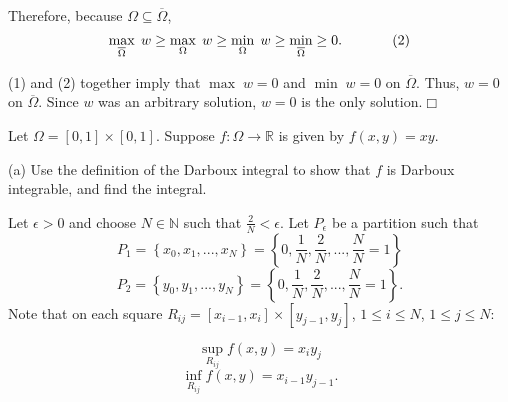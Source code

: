 \documentclass[11pt]{article}
\begin{document}
\begin{itemize}
\noindent Therefore, because $\Omega\subseteq \overline{\Omega}$,
\[
\max\limits_{\overline{\Omega}}\;w\geq \max\limits_\Omega\;w\geq \min\limits_\Omega\;w\geq\min\limits_{\overline{\Omega}}\geq 0.\hspace{.5in}(2)
\]

\vspace{.2in} (1) and (2) together imply that $\max\;w=0$ and $\min\;w=0$ on $\overline{\Omega}$. Thus, $w=0$ on $\overline{\Omega}$.  Since $w$ was an arbitrary solution, $w=0$ is the only solution.\hfill $\Box$


\end{itemize}

\vspace{.5in}

\noindent {\bf [5]} Let $\Omega=[0,1]\times[0,1]$. Suppose $f:\Omega\rightarrow\mathbb{R}$ is given by $f(x,y)=xy$.

\vspace{.2in}

\noindent (a) Use the definition of the Darboux integral to show that $f$ is Darboux integrable, and find the integral.

\vspace{.2in}

\noindent Let $\epsilon>0$ and choose $N\in\mathbb{N}$ such that $\frac{2}{N}<\epsilon$. Let $P_\epsilon$ be a partition such that 
\[
P_1=\left\{x_0,x_1,...,x_N\right\}=\left\{0,\frac{1}{N},\frac{2}{N},...,\frac{N}{N}=1\right\}
\]
\[
P_2=\left\{y_0,y_1,...,y_N\right\}=\left\{0,\frac{1}{N},\frac{2}{N},...,\frac{N}{N}=1\right\}.
\]
\noindent Note that on each square $R_{ij}=[x_{i-1},x_i]\times[y_{j-1},y_j]$, $1\leq i\leq N$, $1\leq j\leq N$:
\vspace{.1in}

\[
\sup\limits_{R_{ij}}f(x,y)=x_iy_j
\]
\[
\inf\limits_{R_{ij}}f(x,y)=x_{i-1}y_{j-1}.
\]

\vspace{.2in}
\end{document}
